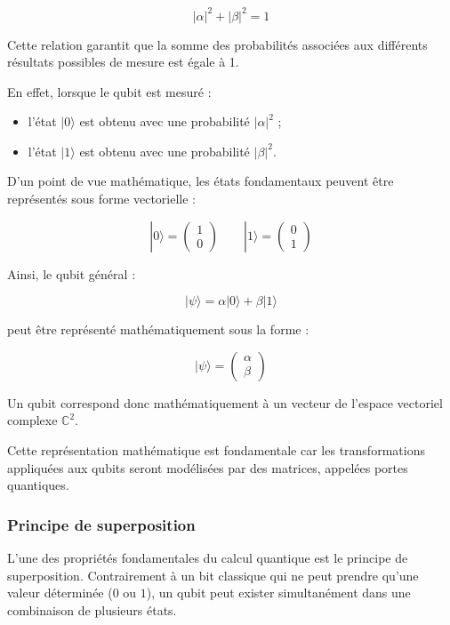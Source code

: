 \documentclass[a4paper,12pt]{article}
\begin{document}
\[
|\alpha|^2 + |\beta|^2 = 1
\]

Cette relation garantit que la somme des probabilités associées aux différents résultats possibles de mesure est égale à 1.

En effet, lorsque le qubit est mesuré :

\begin{itemize}
    \item l’état $|0\rangle$ est obtenu avec une probabilité $|\alpha|^2$ ;
    \item l’état $|1\rangle$ est obtenu avec une probabilité $|\beta|^2$.
\end{itemize}

D’un point de vue mathématique, les états fondamentaux peuvent être représentés sous forme vectorielle :

\[
|0\rangle
=
\begin{pmatrix}
1\\
0
\end{pmatrix}
\qquad
|1\rangle
=
\begin{pmatrix}
0\\
1
\end{pmatrix}
\]

Ainsi, le qubit général :

\[
|\psi\rangle
=
\alpha |0\rangle
+
\beta |1\rangle
\]

peut être représenté mathématiquement sous la forme :

\[
|\psi\rangle
=
\begin{pmatrix}
\alpha \\
\beta
\end{pmatrix}
\]

Un qubit correspond donc mathématiquement à un vecteur de l’espace vectoriel complexe $\mathbb{C}^2$.

Cette représentation mathématique est fondamentale car les transformations appliquées aux qubits seront modélisées par des matrices, appelées portes quantiques.

\subsubsection{Principe de superposition}


L’une des propriétés fondamentales du calcul quantique est le principe de superposition. Contrairement à un bit classique qui ne peut prendre qu’une valeur déterminée ($0$ ou $1$), un qubit peut exister simultanément dans une combinaison de plusieurs états.
\end{document}
